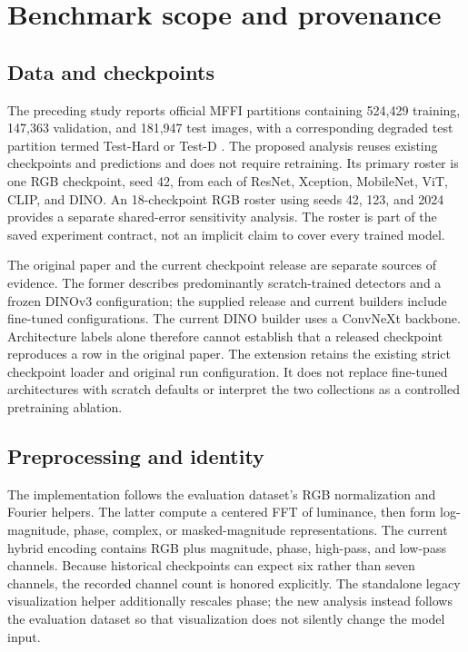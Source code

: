 \documentclass{article}
\begin{document}
\section{Benchmark scope and provenance}
\subsection{Data and checkpoints}
The preceding study reports official MFFI partitions containing 524,429 training, 147,363 validation, and 181,947 test images, with a corresponding degraded test partition termed Test-Hard or Test-D \citep{cunha2026}. The proposed analysis reuses existing checkpoints and predictions and does not require retraining. Its primary roster is one RGB checkpoint, seed 42, from each of ResNet, Xception, MobileNet, ViT, CLIP, and DINO. An 18-checkpoint RGB roster using seeds 42, 123, and 2024 provides a separate shared-error sensitivity analysis. The roster is part of the saved experiment contract, not an implicit claim to cover every trained model.

The original paper and the current checkpoint release are separate sources of evidence. The former describes predominantly scratch-trained detectors and a frozen DINOv3 configuration; the supplied release and current builders include fine-tuned configurations. The current DINO builder uses a ConvNeXt backbone. Architecture labels alone therefore cannot establish that a released checkpoint reproduces a row in the original paper. The extension retains the existing strict checkpoint loader and original run configuration. It does not replace fine-tuned architectures with scratch defaults or interpret the two collections as a controlled pretraining ablation.

\subsection{Preprocessing and identity}
The implementation follows the evaluation dataset's RGB normalization and Fourier helpers. The latter compute a centered FFT of luminance, then form log-magnitude, phase, complex, or masked-magnitude representations. The current hybrid encoding contains RGB plus magnitude, phase, high-pass, and low-pass channels. Because historical checkpoints can expect six rather than seven channels, the recorded channel count is honored explicitly. The standalone legacy visualization helper additionally rescales phase; the new analysis instead follows the evaluation dataset so that visualization does not silently change the model input.
\end{document}
